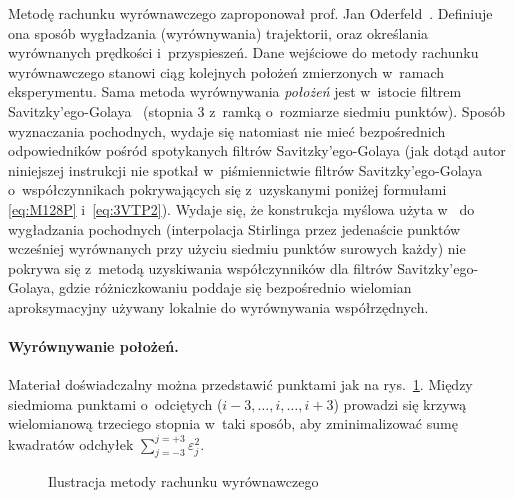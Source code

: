 \documentclass[paper=a4,DIV=12]{tmmlab}
\begin{document}
\begin{appendices}
  Metodę rachunku wyrównawczego zaproponował prof. Jan
  Oderfeld~\cite{oderfeld:1958:opewnym,oderfeld:1962:wstep}. Definiuje ona
  sposób wygładzania (wyrównywania) trajektorii, oraz określania
  wyrównanych prędkości i~przyspieszeń. Dane wejściowe do metody rachunku
  wyrównawczego stanowi ciąg kolejnych położeń zmierzonych w~ramach
  eksperymentu. Sama metoda wyrównywania \emph{położeń} jest w~istocie filtrem
  Savitzky'ego-Golaya~\cite{savitzky&golay:1964:smoothing,orfanidis:2010:introduction}
  (stopnia $3$ z~ramką o~rozmiarze siedmiu punktów). Sposób wyznaczania
  pochodnych, wydaje się natomiast nie mieć bezpośrednich odpowiedników pośród
  spotykanych filtrów Savitzky'ego-Golaya (jak dotąd autor niniejszej
  instrukcji nie spotkał w~piśmiennictwie filtrów Savitzky'ego-Golaya
  o~współczynnikach pokrywających się z~uzyskanymi poniżej formułami
  \eqref{eq:M128P} i~\eqref{eq:3VTP2}). Wydaje się, że konstrukcja myślowa
  użyta w~\cite{oderfeld:1958:opewnym} do wygładzania pochodnych (interpolacja
  Stirlinga przez jedenaście punktów wcześniej wyrównanych przy użyciu siedmiu
  punktów surowych każdy) nie pokrywa się z~metodą uzyskiwania współczynników
  dla filtrów Savitzky'ego-Golaya, gdzie różniczkowaniu poddaje się
  bezpośrednio wielomian aproksymacyjny używany lokalnie do wyrównywania
  współrzędnych.


  \paragraph{Wyrównywanie położeń.} Materiał doświadczalny można przedstawić
  punktami jak na rys.~\ref{fig:A9KNP}. Między siedmioma punktami o~odciętych
  ($i-3, \dots, i,\dots, i+3$) prowadzi się krzywą wielomianową trzeciego stopnia
  w~taki sposób, aby zminimalizować sumę kwadratów odchyłek
  $\sum_{j=-3}^{j=+3}{\varepsilon_j^2}$.
  \begin{figure}[htbp]
    \centering
    
    \caption{Ilustracja metody rachunku wyrównawczego}
    \label{fig:A9KNP}
  \end{figure}


\end{appendices}
\end{document}
